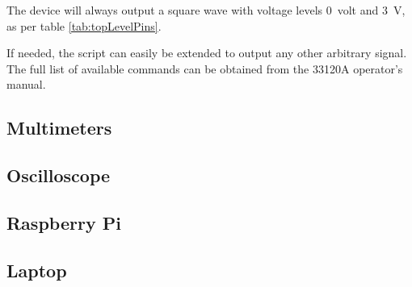 The  device  will always output a square wave  with voltage levels
\SI{0}{volt} and \SI{3}{\volt}, as per table \ref{tab:topLevelPins}.

If needed,  the script can  easily be extended  to output any  other arbitrary
signal. The full  list of available commands  can be obtained from  the 33120A
operator's manual.



\subsection{Multimeters}
\label{subsec:34465A}


\subsection{Oscilloscope}
\label{subsec:oscilloscope}


\subsection{Raspberry Pi}
\label{subsec:raspi}



\subsection{Laptop}
\label{subsec:laptop}

